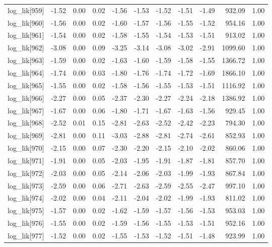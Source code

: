 \begin{table}[ht]
\begin{tabular}{rrrrrrrrrrr}
  log\_lik[959] & -1.52 & 0.00 & 0.02 & -1.56 & -1.53 & -1.52 & -1.51 & -1.49 & 932.09 & 1.00 \\ 
  log\_lik[960] & -1.56 & 0.00 & 0.02 & -1.60 & -1.57 & -1.56 & -1.55 & -1.52 & 954.16 & 1.00 \\ 
  log\_lik[961] & -1.54 & 0.00 & 0.02 & -1.58 & -1.55 & -1.54 & -1.53 & -1.51 & 913.02 & 1.00 \\ 
  log\_lik[962] & -3.08 & 0.00 & 0.09 & -3.25 & -3.14 & -3.08 & -3.02 & -2.91 & 1099.60 & 1.00 \\ 
  log\_lik[963] & -1.59 & 0.00 & 0.02 & -1.63 & -1.60 & -1.59 & -1.58 & -1.55 & 1366.72 & 1.00 \\ 
  log\_lik[964] & -1.74 & 0.00 & 0.03 & -1.80 & -1.76 & -1.74 & -1.72 & -1.69 & 1866.10 & 1.00 \\ 
  log\_lik[965] & -1.55 & 0.00 & 0.02 & -1.58 & -1.56 & -1.55 & -1.53 & -1.51 & 1116.92 & 1.00 \\ 
  log\_lik[966] & -2.27 & 0.00 & 0.05 & -2.37 & -2.30 & -2.27 & -2.24 & -2.18 & 1386.92 & 1.00 \\ 
  log\_lik[967] & -1.67 & 0.00 & 0.06 & -1.80 & -1.71 & -1.67 & -1.63 & -1.56 & 929.45 & 1.00 \\ 
  log\_lik[968] & -2.52 & 0.01 & 0.15 & -2.81 & -2.63 & -2.52 & -2.42 & -2.23 & 794.30 & 1.00 \\ 
  log\_lik[969] & -2.81 & 0.00 & 0.11 & -3.03 & -2.88 & -2.81 & -2.74 & -2.61 & 852.93 & 1.00 \\ 
  log\_lik[970] & -2.15 & 0.00 & 0.07 & -2.30 & -2.20 & -2.15 & -2.10 & -2.02 & 860.06 & 1.00 \\ 
  log\_lik[971] & -1.91 & 0.00 & 0.05 & -2.03 & -1.95 & -1.91 & -1.87 & -1.81 & 857.70 & 1.00 \\ 
  log\_lik[972] & -2.03 & 0.00 & 0.05 & -2.14 & -2.06 & -2.03 & -1.99 & -1.93 & 867.84 & 1.00 \\ 
  log\_lik[973] & -2.59 & 0.00 & 0.06 & -2.71 & -2.63 & -2.59 & -2.55 & -2.47 & 997.10 & 1.00 \\ 
  log\_lik[974] & -2.02 & 0.00 & 0.04 & -2.11 & -2.04 & -2.02 & -1.99 & -1.93 & 811.02 & 1.00 \\ 
  log\_lik[975] & -1.57 & 0.00 & 0.02 & -1.62 & -1.59 & -1.57 & -1.56 & -1.53 & 953.03 & 1.00 \\ 
  log\_lik[976] & -1.55 & 0.00 & 0.02 & -1.59 & -1.56 & -1.55 & -1.53 & -1.51 & 952.16 & 1.00 \\ 
  log\_lik[977] & -1.52 & 0.00 & 0.02 & -1.55 & -1.53 & -1.52 & -1.51 & -1.48 & 923.99 & 1.00 \\ 

\end{tabular}
\end{table}
